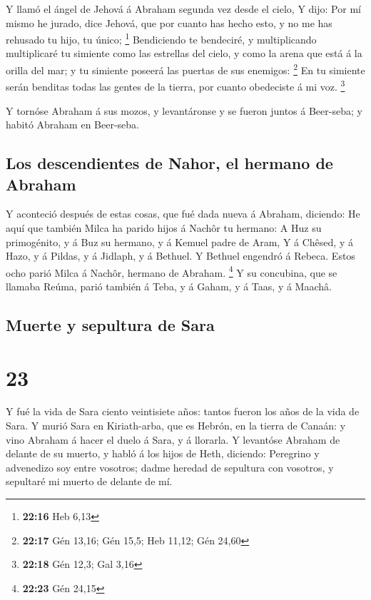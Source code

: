  Y llamó el ángel de Jehová á Abraham segunda vez desde
el cielo,  Y dijo: Por mí mismo he jurado, dice Jehová,
que por cuanto has hecho esto, y no me has rehusado tu hijo, tu único;
\footnote{\textbf{22:16} Heb 6,13}  Bendiciendo te
bendeciré, y multiplicando multiplicaré tu simiente como las estrellas
del cielo, y como la arena que está á la orilla del mar; y tu simiente
poseerá las puertas de sus enemigos: \footnote{\textbf{22:17} Gén 13,16;
  Gén 15,5; Heb 11,12; Gén 24,60}  En tu simiente serán
benditas todas las gentes de la tierra, por cuanto obedeciste á mi voz.
\footnote{\textbf{22:18} Gén 12,3; Gal 3,16}

 Y tornóse Abraham á sus mozos, y levantáronse y se
fueron juntos á Beer-seba; y habitó Abraham en Beer-seba.

\hypertarget{los-descendientes-de-nahor-el-hermano-de-abraham}{%
\subsection{Los descendientes de Nahor, el hermano de
Abraham}\label{los-descendientes-de-nahor-el-hermano-de-abraham}}

 Y aconteció después de estas cosas, que fué dada nueva á
Abraham, diciendo: He aquí que también Milca ha parido hijos á Nachôr tu
hermano:  A Huz su primogénito, y á Buz su hermano, y á
Kemuel padre de Aram,  Y á Chêsed, y á Hazo, y á Pildas,
y á Jidlaph, y á Bethuel.  Y Bethuel engendró á Rebeca.
Estos ocho parió Milca á Nachôr, hermano de Abraham. \footnote{\textbf{22:23}
  Gén 24,15}  Y su concubina, que se llamaba Reúma, parió
también á Teba, y á Gaham, y á Taas, y á Maachâ.

\hypertarget{muerte-y-sepultura-de-sara}{%
\subsection{Muerte y sepultura de
Sara}\label{muerte-y-sepultura-de-sara}}

\hypertarget{section-22}{%
\section{23}\label{section-22}}

 Y fué la vida de Sara ciento veintisiete años: tantos
fueron los años de la vida de Sara.  Y murió Sara en
Kiriath-arba, que es Hebrón, en la tierra de Canaán: y vino Abraham á
hacer el duelo á Sara, y á llorarla.  Y levantóse Abraham
de delante de su muerto, y habló á los hijos de Heth, diciendo:
 Peregrino y advenedizo soy entre vosotros; dadme heredad
de sepultura con vosotros, y sepultaré mi muerto de delante de mí.

